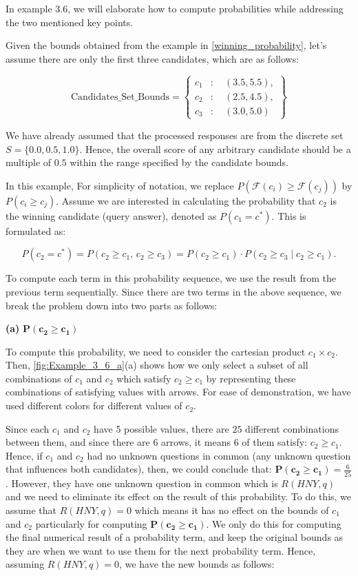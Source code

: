 In example 3.6, we will elaborate how to compute probabilities while addressing the two mentioned key points. 

\begin{example}
    Given the bounds obtained from the example in \autoref{winning_probability}, let's assume there are only the first three candidates, which are as follows:

    \[
    \text{Candidates\_Set\_Bounds} = 
    \left\{ 
    \begin{array}{ll}
    c_1 & : \quad (3.5, 5.5), \\ 
    c_2 & : \quad (2.5, 4.5), \\ 
    c_3 & : \quad (3.0, 5.0)
    \end{array}
    \right\}
\]


    We have already assumed that the processed responses are from the discrete set $S = \{0.0, 0.5, 1.0\}$. Hence, the overall score of any arbitrary candidate should be a multiple of $0.5$ within the range specified by the candidate bounds. 

    In this example, For simplicity of notation, we replace $P(\mathcal{F}(c_i) \geq \mathcal{F}(c_j))$ by $P(c_i \geq c_j)$. Assume we are interested in calculating the probability that \( c_2 \) is the winning candidate (query answer), denoted as \( P(c_1 = c^*) \). This is formulated as:

    \[
    P(c_2 = c^*) = P(c_2 \geq c_1, \, c_2 \geq c_3) = P(c_2 \geq c_1) \cdot P(c_2 \geq c_3 \mid c_2 \geq c_1).
    \]

    To compute each term in this probability sequence, we use the result from the previous term sequentially. Since there are two terms in the above sequence, we break the problem down into two parts as follows: 
    
\textbf{(a)} \(\mathbf{P(c_2 \geq c_1)}\)


To compute this probability, we need to consider the cartesian product $c_1 \times c_2$. Then, \autoref{fig:Example_3_6_a}(a) shows how we only select a subset of all combinations of $c_1$ and $c_2$ which satisfy $c_2 \geq c_1$ by representing these combinations of satisfying values with arrows. For ease of demonstration, we have used different colors for different values of $c_2$.

Since each $c_1$ and $c_2$ have 5 possible values, there are $25$ different combinations between them, and since there are 6 arrows, it means 6 of them satisfy: $c_2 \geq c_1$. Hence, if $c_1$ and $c_2$ had no unknown questions in common (any unknown question that influences both candidates), then, we could conclude that: \(\mathbf{P(c_2 \geq c_1)} = \frac{6}{25}\). However, they have one unknown question in common which is $R(HNY, q)$ and we need to eliminate its effect on the result of this probability. To do this, we assume that $R(HNY, q) = 0$ which means it has no effect on the bounds of $c_1$ and $c_2$ particularly for computing \(\mathbf{P(c_2 \geq c_1)}\). We only do this for computing the final numerical result of a probability term, and keep the original bounds as they are when we want to use them for the next probability term. Hence, assuming $R(HNY, q) = 0$, we have the new bounds as follows:


\end{example}
